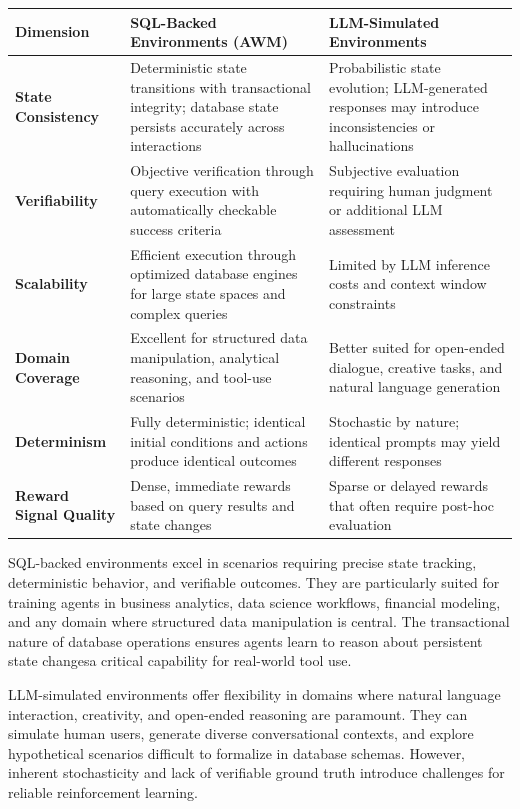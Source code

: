\begin{table}[tbp]
\centering
\footnotesize
\begin{tabularx}{\textwidth}{YYY}
\toprule
\textbf{Dimension} & \textbf{SQL-Backed Environments (AWM)} & \textbf{LLM-Simulated Environments} \\
\midrule
\textbf{State Consistency} & Deterministic state transitions with transactional integrity; database state persists accurately across interactions & Probabilistic state evolution; LLM-generated responses may introduce inconsistencies or hallucinations \\
\textbf{Verifiability} & Objective verification through query execution with automatically checkable success criteria & Subjective evaluation requiring human judgment or additional LLM assessment \\
\textbf{Scalability} & Efficient execution through optimized database engines for large state spaces and complex queries & Limited by LLM inference costs and context window constraints \\
\textbf{Domain Coverage} & Excellent for structured data manipulation, analytical reasoning, and tool-use scenarios & Better suited for open-ended dialogue, creative tasks, and natural language generation \\
\textbf{Determinism} & Fully deterministic; identical initial conditions and actions produce identical outcomes & Stochastic by nature; identical prompts may yield different responses \\
\textbf{Reward Signal Quality} & Dense, immediate rewards based on query results and state changes & Sparse or delayed rewards that often require post-hoc evaluation \\
\bottomrule
\end{tabularx}
\end{table}

SQL-backed environments excel in scenarios requiring precise state tracking, deterministic behavior, and verifiable outcomes. They are particularly suited for training agents in business analytics, data science workflows, financial modeling, and any domain where structured data manipulation is central. The transactional nature of database operations ensures agents learn to reason about persistent state changesa critical capability for real-world tool use.

LLM-simulated environments offer flexibility in domains where natural language interaction, creativity, and open-ended reasoning are paramount. They can simulate human users, generate diverse conversational contexts, and explore hypothetical scenarios difficult to formalize in database schemas. However, inherent stochasticity and lack of verifiable ground truth introduce challenges for reliable reinforcement learning.

